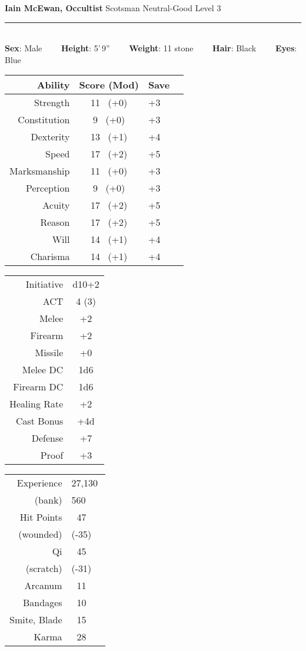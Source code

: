 \documentclass[11pt]{article}
\newcommand{\heading}[1]{{\sc\bfseries #1}}
\begin{document}
\pagestyle{empty}
\noindent
{\huge\bfseries Iain McEwan, Occultist}
\hfill
{\Large Scotsman}
\hfill
{\Large Neutral-Good}
\hfill
{\Large Level 3}
\\[-8pt]
\hrule

\mbox{ }
\\[6pt]
\heading{Sex}: Male
\ \ \ \
\heading{Height}: 5'\,9''
\ \ \ \
\heading{Weight}: 11 stone
\ \ \ \
\heading{Hair}: Black
\ \ \ \
\heading{Eyes}: Blue

\noindent
\begin{tabular}[t]{|r|c|l|c|}
\hline
\heading{Ability}
& \heading{Score (Mod)}
& \heading{Save}
\\ \hline \hline
\sc Strength & 11 \ (+0)
& +3
\\
\sc Constitution & 9 \ (+0)
& +3
\\ \hline
\sc Dexterity & 13 \ (+1)
& +4
\\
\sc Speed & 17 \ (+2)
& +5
\\ \hline
\sc Marksmanship & 11 \ (+0)
& +3
\\
\sc Perception & 9 \ (+0)
& +3
\\
\sc Acuity & 17 \ (+2)
& +5
\\ \hline
\sc Reason & 17 \ (+2)
& +5
\\
\sc Will & 14 \ (+1)
& +4
\\
\sc Charisma & 14 \ (+1)
& +4
\\ \hline
\end{tabular}
\hfill
\begin{tabular}[t]{|r|c|}
\hline
\sc Initiative & d10+2
\\
\sc ACT & 4 (3)
\\  \hline
\sc Melee & +2
\\
\sc Firearm & +2
\\
\sc Missile & +0
\\ \hline
\sc Melee DC & 1d6
\\
\sc Firearm DC & 1d6
\\ \hline
\sc Healing Rate & +2
\\ \hline
\sc Cast Bonus & +4d
\\ \hline
\sc Defense & +7
\\
\sc Proof & +3
\\ \hline
\end{tabular}
%
\hfill
%
\begin{tabular}[t]{|r|c|c|}
\hline
\sc Experience & \multicolumn{2}{|l|}{27,130}
\\
(bank) & \multicolumn{2}{|l|}{560}
\\ \hline
\sc Hit Points & 47 & \hspace*{8em}
\\
(wounded) & (-35) &
\\[2pt] \hline
\sc Qi &  45 &
\\ (scratch) & (-31) &
\\[2pt] \hline
\sc Arcanum & 11 &
\\[2pt] \hline
\sc Bandages & 10 &
\\[2pt] \hline
\sc Smite, Blade & 15 &
\\[2pt] \hline
\sc Karma & 28 &
\\ \hline
\end{tabular}
\end{document}
